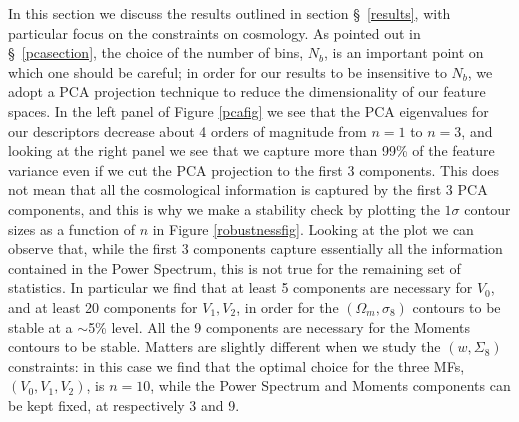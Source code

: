 \documentclass[reprint,aps,prd,superscriptaddress,showkeys,showpacs]{revtex4-1}
\begin{document}
In this section we discuss the results outlined in section \S~\ref{results}, with particular focus on the constraints on cosmology. As pointed out in \S~\ref{pcasection}, the choice of the number of bins, $N_b$, is an important point on which one should be careful; in order for our results to be insensitive to $N_b$, we adopt a PCA projection technique to reduce the dimensionality of our feature spaces. In the left panel of Figure \ref{pcafig} we see that the PCA eigenvalues for our descriptors decrease about 4 orders of magnitude from $n=1$ to $n=3$, and looking at the right panel we see that we capture more than 99\% of the feature variance even if we cut the PCA projection to the first 3 components. This does not mean that all the cosmological information is captured by the first 3 PCA components, and this is why we make a stability check by plotting the $1\sigma$ contour sizes as a function of $n$ in Figure \ref{robustnessfig}. Looking at the plot we can observe that, while the first 3 components capture essentially all the information contained in the Power Spectrum, this is not true for the remaining set of statistics. In particular we find that at least 5 components are necessary for $V_0$, and at least 20 components for $V_1,V_2$, in order for the $(\Omega_m,\sigma_8)$ contours to be stable at a $\sim$5\% level. All the 9 components are necessary for the Moments contours to be stable. Matters are slightly different when we study the $(w,\Sigma_8)$ constraints: in this case we find that the optimal choice for the three MFs, $(V_0,V_1,V_2)$, is $n=10$, while the Power Spectrum and Moments components can be kept fixed, at respectively 3 and 9. 
\end{document}
